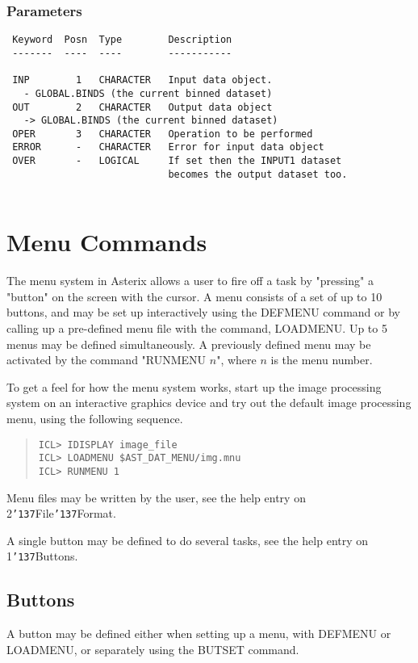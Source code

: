 \documentclass{book}
\renewcommand{\_}{{\tt\char'137}}     %
\begin{document}
\subsection{Parameters}
\begin{verbatim}
 Keyword  Posn  Type        Description
 -------  ----  ----        -----------
 
 INP        1   CHARACTER   Input data object.
   - GLOBAL.BINDS (the current binned dataset)
 OUT        2   CHARACTER   Output data object
   -> GLOBAL.BINDS (the current binned dataset)
 OPER       3   CHARACTER   Operation to be performed
 ERROR      -   CHARACTER   Error for input data object
 OVER       -   LOGICAL     If set then the INPUT1 dataset
                            becomes the output dataset too.
 
\end{verbatim}\chapter{Menu Commands}
The menu system in Asterix allows a user to fire off a task by "pressing"
a "button" on the screen with the cursor. A menu consists of a set of
up to 10 buttons, and may be set up interactively using the DEFMENU
command or by calling up a pre-defined menu file with the command, LOADMENU.
Up to 5 menus may be defined simultaneously. A previously defined menu
may be activated by the command "RUNMENU $n$", where
$n$ is the menu number.
 
To get a feel for how the menu system works, start up the image processing
system on an interactive graphics device and try out the default image
processing menu, using the following sequence.
 
\begin{quote}\begin{verbatim}
ICL> IDISPLAY image_file
ICL> LOADMENU $AST_DAT_MENU/img.mnu
ICL> RUNMENU 1
\end{verbatim}\end{quote}
Menu files may be written by the user, see the help entry on
2\_File\_Format.
 
A single button may be defined to do several tasks, see the help entry
on 1\_Buttons.
 
\section{Buttons}
A button may be defined either when setting up a menu, with DEFMENU or
LOADMENU, or separately using the BUTSET command.
 
\end{document}
